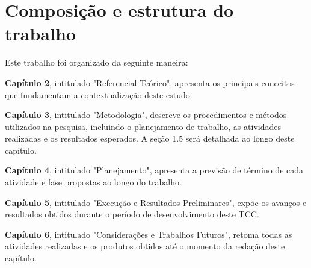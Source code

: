 \section{Composição e estrutura do trabalho}
Este trabalho foi organizado da seguinte maneira:

\textbf{Capítulo 2}, intitulado "Referencial Teórico", apresenta os principais conceitos que fundamentam a contextualização deste estudo.

\textbf{Capítulo 3}, intitulado "Metodologia", descreve os procedimentos e métodos utilizados na pesquisa, incluindo o planejamento de trabalho, as atividades realizadas e os resultados esperados. A seção 1.5 será detalhada ao longo deste capítulo.

\textbf{Capítulo 4}, intitulado "Planejamento", apresenta a previsão de término de cada atividade e fase propostas ao longo do trabalho.

\textbf{Capítulo 5}, intitulado "Execução e Resultados Preliminares", expõe os avanços e resultados obtidos durante o período de desenvolvimento deste TCC.

\textbf{Capítulo 6}, intitulado "Considerações e Trabalhos Futuros", retoma todas as atividades realizadas e os produtos obtidos até o momento da redação deste capítulo.